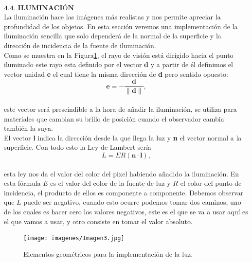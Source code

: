 ${ }$\\
$\textbf{4.4. ILUMINACIÓN}$
${ }$\\

La iluminación hace las imágenes más realistas y nos permite apreciar la profundidad de los objetos. En esta sección veremos una implementación de la iluminación sencilla que solo dependerá de la normal de la superficie y la dirección de incidencia de la fuente de iluminación. 
${ }$\\

Como se muestra en la Figura\ref{fig:etiq_5}, el rayo de visión está dirigido hacia el punto iluminado este rayo esta definido por el vector \textbf{d} y a partir de él definimos el vector unidad \textbf{e} el cual tiene la misma dirección de \textbf{d} pero sentido opuesto:
${ }$\\


\[
	\textbf{e} = - \frac{\textbf{d}}{\|\textbf{d}\|},
\]
${ }$\\
este vector será prescindible a la hora de añadir la iluminación, se utiliza para materiales que cambian su brillo de posición cuando el observador cambia también la suya.
${ }$\\


El vector \textbf{l} indica la dirección desde la que llega la luz y \textbf{n} el vector normal a la superficie. Con todo esto la Ley de Lambert sería
${ }$\\
\[
	L = ER(\textbf{n}\cdot \textbf{l}),
\]
${ }$\\
esta ley nos da el valor del color del pixel habiendo añadido la iluminación. En esta fórmula $E$ es el valor del color de la fuente de luz y $R$ el color del punto de incidencia, el producto de ellos es componente a componente. Debemos observar que $L$ puede ser negativo, cuando esto ocurre podemos tomar dos caminos, uno de los cuales es hacer cero los valores negativos, este es el que se va a usar aquí es el que vamos a usar, y otro consiste en tomar el valor absoluto.
	${ }$\\	


\begin{figure}
	\begin{center}
		\texttt{[image: imagenes/Imagen3.jpg]}
	\end{center}
	\caption{Elementos geométricos para la implementación de la luz.}
	\label{fig:etiq_5}
\end{figure}





